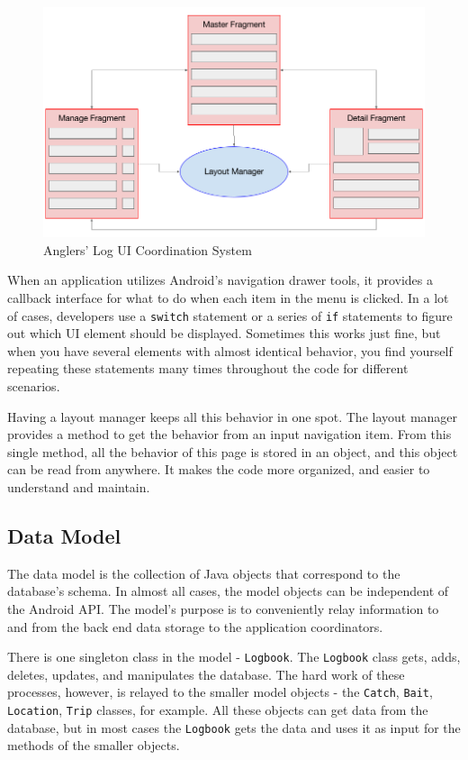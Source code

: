 \documentclass{article}
\begin{document}
	\begin{figure}[h]
		\caption{Anglers' Log UI Coordination System}
		\includegraphics[width=\textwidth]{coordinators}
	\end{figure}
	
	When an application utilizes Android's navigation drawer tools, it provides a callback interface for what to do when each item in the menu is clicked.  In a lot of cases, developers use a \texttt{switch} statement or a series of \texttt{if} statements to figure out which UI element should be displayed.  Sometimes this works just fine, but when you have several elements with almost identical behavior, you find yourself repeating these statements many times throughout the code for different scenarios.

	Having a layout manager keeps all this behavior in one spot.  The layout manager provides a method to get the behavior from an input navigation item.  From this single method, all the behavior of this page is stored in an object, and this object can be read from anywhere.  It makes the code more organized, and easier to understand and maintain.


	\subsection{Data Model}
	
	The data model is the collection of Java objects that correspond to the database's schema.  In almost all cases, the model objects can be independent of the Android API.  The model's purpose is to conveniently relay information to and from the back end data storage to the application coordinators.  

	There is one singleton class in the model - \texttt{Logbook}.  The \texttt{Logbook} class gets, adds, deletes, updates, and manipulates the database.  The hard work of these processes, however, is relayed to the smaller model objects - the \texttt{Catch}, \texttt{Bait}, \texttt{Location}, \texttt{Trip} classes, for example.  All these objects can get data from the database, but in most cases the \texttt{Logbook} gets the data and uses it as input for the methods of the smaller objects.
\end{document}
